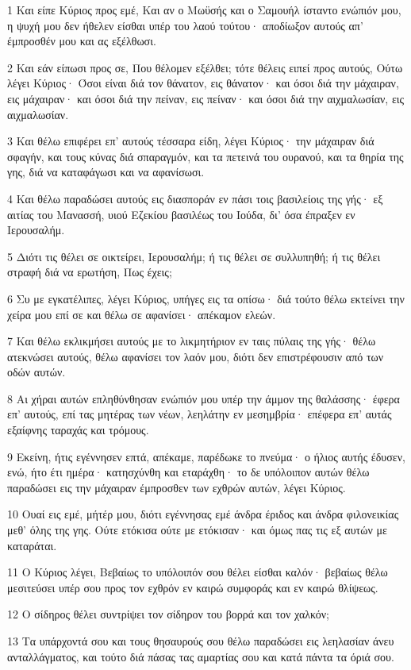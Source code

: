 \par 1 Και είπε Κύριος προς εμέ, Και αν ο Μωϋσής και ο Σαμουήλ ίσταντο ενώπιόν μου, η ψυχή μου δεν ήθελεν είσθαι υπέρ του λαού τούτου· αποδίωξον αυτούς απ' έμπροσθέν μου και ας εξέλθωσι.
\par 2 Και εάν είπωσι προς σε, Που θέλομεν εξέλθει; τότε θέλεις ειπεί προς αυτούς, Ούτω λέγει Κύριος· Όσοι είναι διά τον θάνατον, εις θάνατον· και όσοι διά την μάχαιραν, εις μάχαιραν· και όσοι διά την πείναν, εις πείναν· και όσοι διά την αιχμαλωσίαν, εις αιχμαλωσίαν.
\par 3 Και θέλω επιφέρει επ' αυτούς τέσσαρα είδη, λέγει Κύριος· την μάχαιραν διά σφαγήν, και τους κύνας διά σπαραγμόν, και τα πετεινά του ουρανού, και τα θηρία της γης, διά να καταφάγωσι και να αφανίσωσι.
\par 4 Και θέλω παραδώσει αυτούς εις διασποράν εν πάσι τοις βασιλείοις της γής· εξ αιτίας του Μανασσή, υιού Εζεκίου βασιλέως του Ιούδα, δι' όσα έπραξεν εν Ιερουσαλήμ.
\par 5 Διότι τις θέλει σε οικτείρει, Ιερουσαλήμ; ή τις θέλει σε συλλυπηθή; ή τις θέλει στραφή διά να ερωτήση, Πως έχεις;
\par 6 Συ με εγκατέλιπες, λέγει Κύριος, υπήγες εις τα οπίσω· διά τούτο θέλω εκτείνει την χείρα μου επί σε και θέλω σε αφανίσει· απέκαμον ελεών.
\par 7 Και θέλω εκλικμήσει αυτούς με το λικμητήριον εν ταις πύλαις της γής· θέλω ατεκνώσει αυτούς, θέλω αφανίσει τον λαόν μου, διότι δεν επιστρέφουσιν από των οδών αυτών.
\par 8 Αι χήραι αυτών επληθύνθησαν ενώπιόν μου υπέρ την άμμον της θαλάσσης· έφερα επ' αυτούς, επί τας μητέρας των νέων, λεηλάτην εν μεσημβρία· επέφερα επ' αυτάς εξαίφνης ταραχάς και τρόμους.
\par 9 Εκείνη, ήτις εγέννησεν επτά, απέκαμε, παρέδωκε το πνεύμα· ο ήλιος αυτής έδυσεν, ενώ, ήτο έτι ημέρα· κατησχύνθη και εταράχθη· το δε υπόλοιπον αυτών θέλω παραδώσει εις την μάχαιραν έμπροσθεν των εχθρών αυτών, λέγει Κύριος.
\par 10 Ουαί εις εμέ, μήτέρ μου, διότι εγέννησας εμέ άνδρα έριδος και άνδρα φιλονεικίας μεθ' όλης της γης. Ούτε ετόκισα ούτε με ετόκισαν· και όμως πας τις εξ αυτών με καταράται.
\par 11 Ο Κύριος λέγει, Βεβαίως το υπόλοιπόν σου θέλει είσθαι καλόν· βεβαίως θέλω μεσιτεύσει υπέρ σου προς τον εχθρόν εν καιρώ συμφοράς και εν καιρώ θλίψεως.
\par 12 Ο σίδηρος θέλει συντρίψει τον σίδηρον του βορρά και τον χαλκόν;
\par 13 Τα υπάρχοντά σου και τους θησαυρούς σου θέλω παραδώσει εις λεηλασίαν άνευ ανταλλάγματος, και τούτο διά πάσας τας αμαρτίας σου και κατά πάντα τα όριά σου.
